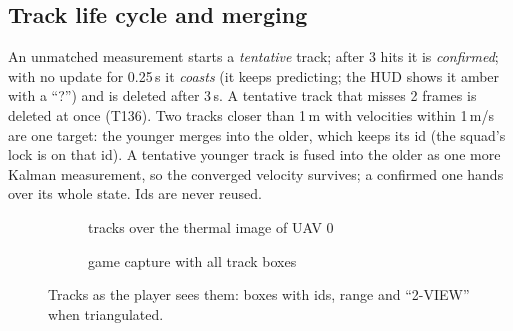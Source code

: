 \begin{figure}[h]
\centering
{}
\caption{}
\end{figure}
\subsection{Track life cycle and merging}
An unmatched measurement starts a \emph{tentative} track; after 3 hits it is \emph{confirmed}; with no update for 0.25\,s it \emph{coasts} (it keeps predicting; the HUD shows it amber with a ``?'') and is deleted after 3\,s. A tentative track that misses 2 frames is deleted at once (T136). Two tracks closer than 1\,m with velocities within 1\,m/s are one target: the younger merges into the older, which keeps its id (the squad's lock is on that id). A tentative younger track is fused into the older as one more Kalman measurement, so the converged velocity survives; a confirmed one hands over its whole state. Ids are never reused.
\begin{figure}[h]
\centering
\begin{subfigure}{0.49\linewidth}\caption{tracks over the thermal image of UAV 0}\end{subfigure}
\begin{subfigure}{0.49\linewidth}\caption{game capture with all track boxes}\end{subfigure}
\caption{Tracks as the player sees them: boxes with ids, range and ``2-VIEW'' when triangulated.}
\end{figure}
